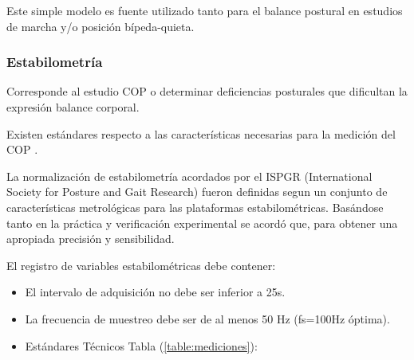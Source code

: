 \documentclass[12pt,a4paper]{article}
\begin{document}
Este simple modelo es fuente utilizado tanto para el balance postural en estudios de marcha y/o posición bípeda-quieta.

\newpage
\subsubsection{Estabilometría}
Corresponde al estudio COP o determinar deficiencias posturales que dificultan la expresión balance corporal.

Existen estándares respecto a las características necesarias para la medición del COP \cite{scoppa_clinical_2013}.

La normalización de estabilometría acordados por el ISPGR (International Society for Posture and Gait Research) fueron definidas segun un conjunto de características metrológicas para las plataformas estabilométricas.
Basándose tanto en la práctica y verificación experimental se acordó que, para obtener una apropiada precisión y sensibilidad.

El registro de variables estabilométricas debe contener:
\begin{itemize}
	\item El intervalo de adquisición no debe ser inferior a 25s.
	\item La frecuencia de muestreo debe ser de al menos 50 Hz (fs=100Hz óptima).
	\item Estándares Técnicos Tabla (\ref{table:mediciones}):
	\begin{table}[H]
		\centering
		\caption{Estándares Técnicos Mediciones.}
		\label{table:mediciones}
	\end{table}	  
\end{itemize}



\newpage
\end{document}
